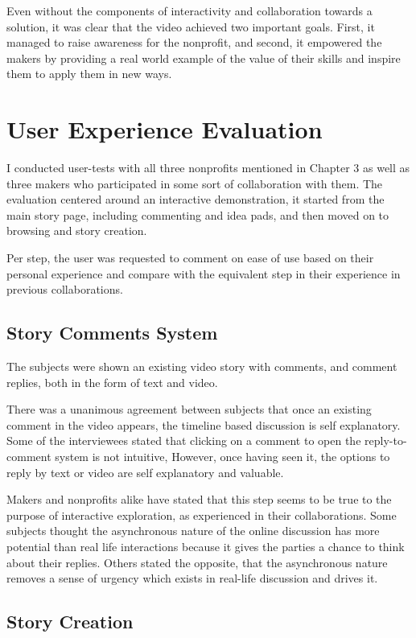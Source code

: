 Even without the components of interactivity and collaboration towards a solution, it was clear that the video achieved two important goals. First, it managed to raise awareness for the nonprofit, and second, it empowered the makers by providing a real world example of the value of their skills and inspire them to apply them in new ways.

\section{User Experience Evaluation}

I conducted user-tests with all three nonprofits mentioned in Chapter 3 as well as three makers who participated in some sort of collaboration with them. The evaluation centered around an interactive demonstration, it started from the main story page, including commenting and idea pads, and then moved on to browsing and story creation. 

Per step, the user was requested to comment on ease of use based on their personal experience and compare with the equivalent step in their experience in previous collaborations. 

\subsection{Story Comments System}

The subjects were shown an existing video story with comments, and comment replies, both in the form of text and video.

There was a unanimous agreement between subjects that once an existing comment in the video appears, the timeline based discussion is self explanatory. Some of the interviewees stated that clicking on a comment to open the reply-to-comment system is not intuitive, However, once having seen it, the options to reply by text or video are self explanatory and valuable.

Makers and nonprofits alike have stated that this step seems to be true to the purpose of interactive exploration, as experienced in their collaborations. Some subjects thought the asynchronous nature of the online discussion has more potential than real life interactions because it gives the parties a chance to think about their replies. Others stated the opposite, that the asynchronous nature removes a sense of urgency which exists in real-life discussion and drives it. 

\subsection{Story Creation}

